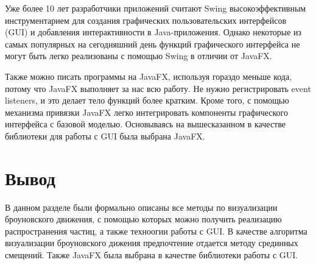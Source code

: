 Уже более 10 лет разработчики приложений считают Swing высокоэффективным инструментарием для создания графических пользовательских интерфейсов (GUI) и добавления интерактивности в Java-приложения. Однако некоторые из самых популярных на сегодняшний день функций графического интерфейса не могут быть легко реализованы с помощью Swing в отличии от JavaFX. 

Также можно писать программы на JavaFX, используя гораздо меньше кода, потому что JavaFX выполняет за нас всю работу. Не нужно регистрировать event listeners, и это делает тело функций более кратким. Кроме того, с помощью механизма привязки JavaFX легко интегрировать компоненты графического интерфейса с базовой моделью. Основываясь на вышесказанном в качестве библиотеки для работы с GUI была выбрана JavaFX.

\section*{Вывод}

В данном разделе были формально описаны все методы по визуализации броуновского движения, с помощью которых можно получить реализацию распространения частиц, а также техноогии работы с GUI. В качестве алгоритма визуализации броуновского дижения предпочтение отдается методу срединных смещений. Также JavaFX была выбрана в качестве библиотеки работы с GUI.

